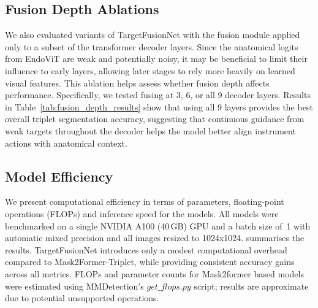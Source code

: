 \subsection{Fusion Depth Ablations}
We also evaluated variants of TargetFusionNet with the fusion module applied only to a subset of the transformer decoder layers. Since the anatomical logits from EndoViT are weak and potentially noisy, it may be beneficial to limit their influence to early layers, allowing later stages to rely more heavily on learned visual features. This ablation helps assess whether fusion depth affects performance. Specifically, we tested fusing at 3, 6, or all 9 decoder layers.
Results in Table~\ref{tab:fusion_depth_results} show that using all 9 layers provides the best overall triplet segmentation accuracy, suggesting that continuous guidance from weak targets throughout the decoder helps the model better align instrument actions with anatomical context.


\begin{table}[t!]
\centering
\caption{Ablation of fusion depth in TargetFusionNet. We vary the number of transformer decoder layers where the target fusion module is applied. Full fusion across all 9 layers yields the highest triplet accuracy ($\mAP_{IVT}^{seg}$).}
\label{tab:fusion_depth_results}
\end{table}



\subsection{Model Efficiency}
We present computational efficiency in terms of parameters, floating-point operations (FLOPs) and inference speed for the models. All models were benchmarked on a single NVIDIA A100 (40\,GB) GPU and a batch size of~1 with automatic mixed precision and all images resized to 1024x1024.
 summarises the results. TargetFusionNet introduces only a modest computational overhead compared to Mask2Former-Triplet, while providing consistent accuracy gains across all metrics. FLOPs and parameter counts for Mask2former based models were estimated using MMDetection’s $get\_flops.py$ script; results are approximate due to potential unsupported operations.


